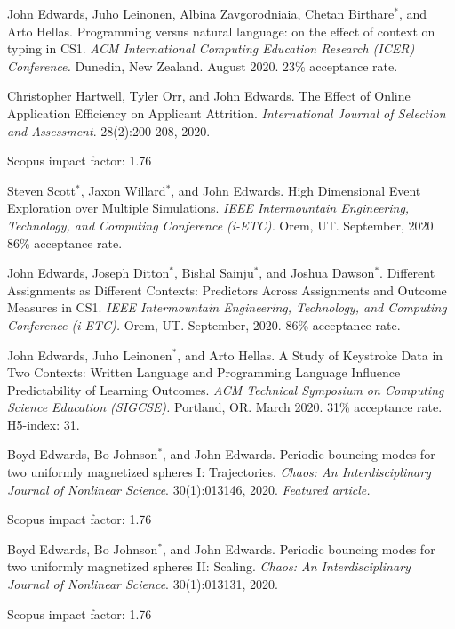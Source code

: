 \documentclass[margin,line]{res}
\newcommand{\pubunder}[1]{#1}
\begin{document}
\begin{resume}
John Edwards, Juho Leinonen, Albina Zavgorodniaia, Chetan Birthare$^*$, and Arto Hellas. Programming versus natural language: on the effect of context on typing in CS1. \textit{ACM International Computing Education Research (ICER) Conference.} Dunedin, New Zealand. August 2020. 23\% acceptance rate.

Christopher Hartwell, Tyler Orr, and \pubunder{John Edwards}. The Effect of Online Application Efficiency on Applicant Attrition. \textit{International Journal of Selection and Assessment}. 28(2):200-208, 2020.
\begin{IMPACT}
Scopus impact factor: 1.76 %
\end{IMPACT}

Steven Scott$^*$, Jaxon Willard$^*$, and \pubunder{John Edwards}. High Dimensional Event Exploration over Multiple Simulations. \textit{IEEE Intermountain Engineering, Technology, and Computing Conference (i-ETC).} Orem, UT. September, 2020. 86\% acceptance rate.

John Edwards, Joseph Ditton$^*$, Bishal Sainju$^*$, and Joshua Dawson$^*$. Different Assignments as Different Contexts: Predictors Across Assignments and Outcome Measures in CS1. \textit{IEEE Intermountain Engineering, Technology, and Computing Conference (i-ETC).} Orem, UT. September, 2020. 86\% acceptance rate.

John Edwards, Juho Leinonen$^*$, and Arto Hellas. A Study of Keystroke Data in Two Contexts: Written Language and Programming Language Influence Predictability of Learning Outcomes.  \textit{ACM Technical Symposium on Computing Science Education (SIGCSE).} Portland, OR. March 2020.  31\% acceptance rate. H5-index: 31.

Boyd Edwards, Bo Johnson$^*$, and \pubunder{John Edwards}. Periodic bouncing modes for two uniformly magnetized spheres I: Trajectories. \textit{Chaos: An Interdisciplinary Journal of Nonlinear Science}. 30(1):013146, 2020. \textit{Featured article.}
\begin{IMPACT}
Scopus impact factor: 1.76 %
\end{IMPACT}

Boyd Edwards, Bo Johnson$^*$, and \pubunder{John Edwards}. Periodic bouncing modes for two uniformly magnetized spheres II: Scaling. \textit{Chaos: An Interdisciplinary Journal of Nonlinear Science}. 30(1):013131, 2020.
\begin{IMPACT}
Scopus impact factor: 1.76 %
\end{IMPACT}


\end{resume}
\end{document}
